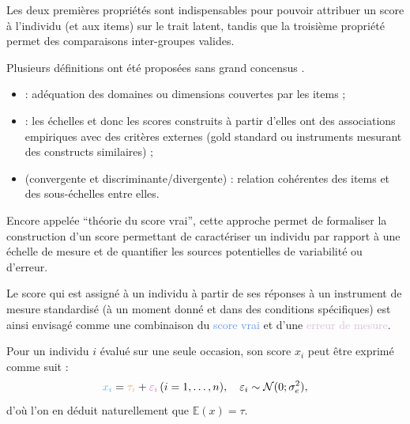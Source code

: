 Les deux premières propriétés sont indispensables pour pouvoir attribuer un
score à l'individu (et aux items) sur le trait latent, tandis que la troisième
propriété permet des comparaisons inter-groupes valides.



Plusieurs définitions ont été proposées sans grand concensus
\autocite{Falissard2008,Zumbo2007}.
\medskip

\begin{itemize}
\item {} : adéquation des domaines ou dimensions
  couvertes par les items ;
\item {} : les échelles et donc les scores
  construits à partir d'elles ont des associations empiriques avec des critères
  externes (gold standard ou instruments mesurant des constructs similaires) ;
\item {} (convergente et
  discriminante/divergente) : relation cohérentes des items et des
  sous-échelles entre elles.
\end{itemize}



Encore appelée \enquote{théorie du score vrai}, cette approche permet de
formaliser la construction d'un score permettant de caractériser un individu par
rapport à une échelle de mesure et de quantifier les sources potentielles de
variabilité ou d'erreur.

Le \textcolor{Apricot}{score} qui est assigné à un individu à partir de ses
réponses à un instrument de mesure standardisé (à un moment donné et dans des
conditions spécifiques) est ainsi envisagé comme une combinaison du
\textcolor{CornflowerBlue}{score vrai} et d'une \textcolor{Thistle}{erreur de
  mesure}.




Pour un individu $i$ évalué sur une seule occasion, son score $x_i$ peut être
exprimé comme suit : 
\[
\textcolor{CornflowerBlue}{x_i} = \textcolor{Apricot}{\tau_i} +
\textcolor{Thistle}{\varepsilon_i}\, (i=1,\dots,n),\quad \varepsilon_i\sim\mathcal{N}(0;\sigma_e^2),
\]
d'où l'on en déduit naturellement que $\mathbb{E}(x)=\tau$.

